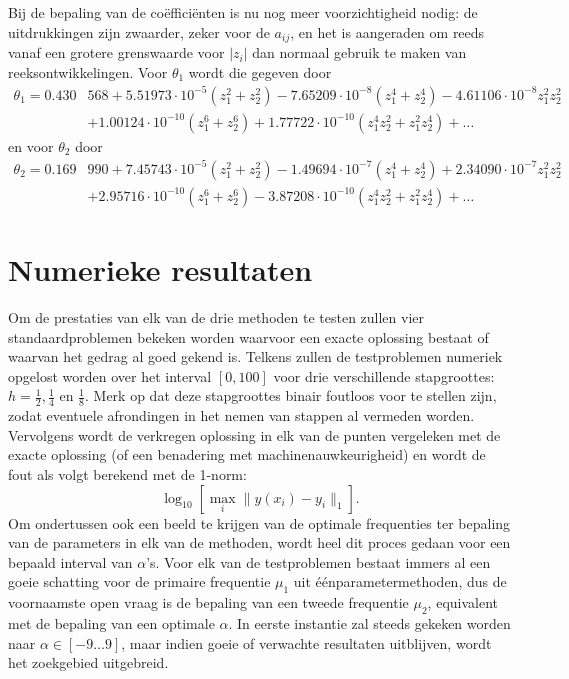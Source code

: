 \documentclass[12pt]{article}
\begin{document}
Bij de bepaling van de coëfficiënten is nu nog meer voorzichtigheid nodig: de uitdrukkingen zijn zwaarder, zeker voor de \(a_{ij}\), en het is aangeraden om reeds vanaf een grotere grenswaarde voor \(|z_i|\) dan normaal gebruik te maken van reeksontwikkelingen. Voor \(\theta_1\) wordt die gegeven door
\begin{equation} \label{eq:theta1rks4series}
\begin{split}
    \theta_1=0.430&568+5.51973\cdot10^{-5}(z_1^2+z_2^2)-7.65209\cdot10^{-8}(z_1^4+z_2^4)-4.61106\cdot10^{-8}z_1^2z_2^2 \\ &+1.00124\cdot10^{-10}(z_1^6+z_2^6)+1.77722\cdot10^{-10}(z_1^4z_2^2+z_1^2z_2^4)+\dots
\end{split}
\end{equation}
en voor \(\theta_2\) door
\begin{equation} \label{eq:theta2rks4series}
\begin{split}
    \theta_2=0.169&990+7.45743\cdot10^{-5}(z_1^2+z_2^2)-1.49694\cdot10^{-7}(z_1^4+z_2^4)+2.34090\cdot10^{-7}z_1^2z_2^2 \\ &+2.95716\cdot10^{-10}(z_1^6+z_2^6)-3.87208\cdot10^{-10}(z_1^4z_2^2+z_1^2z_2^4)+\dots
\end{split}
\end{equation}

\newpage
\section{Numerieke resultaten} \label{sec:numericex}
Om de prestaties van elk van de drie methoden te testen zullen vier standaardproblemen bekeken worden waarvoor een exacte oplossing bestaat of waarvan het gedrag al goed gekend is. Telkens zullen de testproblemen numeriek opgelost worden over het interval \([0,100]\) voor drie verschillende stapgroottes: \(h=\frac{1}{2}, \frac{1}{4}\) en \(\frac{1}{8}\). Merk op dat deze stapgroottes binair foutloos voor te stellen zijn, zodat eventuele afrondingen in het nemen van stappen al vermeden worden. Vervolgens wordt de verkregen oplossing in elk van de punten vergeleken met de exacte oplossing (of een benadering met machinenauwkeurigheid) en wordt de fout als volgt berekend met de 1-norm:
\[\log_{10}\left[\max_i\|y(x_i)-y_i\|_1\right].\]
Om ondertussen ook een beeld te krijgen van de optimale frequenties ter bepaling van de parameters in elk van de methoden, wordt heel dit proces gedaan voor een bepaald interval van \(\alpha\)'s. Voor elk van de testproblemen bestaat immers al een goeie schatting voor de primaire frequentie \(\mu_1\) uit éénparametermethoden, dus de voornaamste open vraag is de bepaling van een tweede frequentie \(\mu_2\), equivalent met de bepaling van een optimale \(\alpha\). In eerste instantie zal steeds gekeken worden naar \(\alpha\in[-9\dots9]\), maar indien goeie of verwachte resultaten uitblijven, wordt het zoekgebied uitgebreid.
\end{document}
